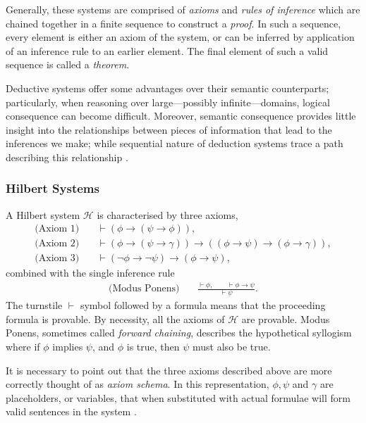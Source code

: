 Generally, these systems are comprised of \textit{axioms} and \textit{rules of inference} which are chained together in a finite sequence to construct a \textit{proof}. In such a sequence, every element is either an axiom of the system, or can be inferred by application of an inference rule to an earlier element. The final element of such a valid sequence is called a \textit{theorem}. 

Deductive systems offer some advantages over their semantic counterparts; particularly, when reasoning over large---possibly infinite---domains, logical consequence can become difficult. Moreover, semantic consequence provides little insight into the relationships between pieces of information that lead to the inferences we make; while sequential nature of deduction systems trace a path describing this relationship \cite[p. 50]{Ben1993Mathematical}.

\subsubsection{Hilbert Systems} 
\label{subsubsection:hilbert-systems}
A Hilbert system $\mathcal{H}$ is characterised by three axioms,
\begin{align}
    \text{(Axiom 1)} \quad & \vdash (\phi \rightarrow (\psi \rightarrow \phi)),  \\ 
    \text{(Axiom 2)} \quad & \vdash (\phi \rightarrow (\psi \rightarrow \gamma)) \rightarrow ((\phi \rightarrow \psi) \rightarrow (\phi \rightarrow \gamma)), \\
    \text{(Axiom 3)} \quad & \vdash (\neg \phi \rightarrow \neg \psi) \rightarrow (\phi \rightarrow \psi),
\end{align}
%
combined with the single inference rule
\begin{align}
     \text{(Modus Ponens)} \quad & \frac{\vdash \phi, \qquad \vdash \phi \rightarrow \psi}{\vdash \psi}.
\end{align}
%
The turnstile $\vdash$ symbol followed by a formula means that the proceeding formula is provable. By necessity, all the axioms of $\mathcal{H}$ are provable. Modus Ponens, sometimes called \textit{forward chaining}, describes the hypothetical syllogism where if $\phi$ implies $\psi$, and $\phi$ is true, then $\psi$ must also be true. 

It is necessary to point out that the three axioms described above are more correctly thought of as \textit{axiom schema}. In this representation, $\phi, \psi$ and $\gamma$ are placeholders, or variables, that when substituted with actual formulae will form valid sentences in the system \cite[p. 55]{Ben1993Mathematical}. 

